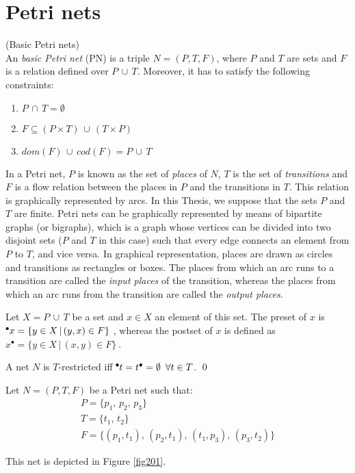 \section{Petri nets}

\begin{definition} (Basic Petri nets)\\
An \emph{basic Petri net} (PN) is a triple $N=(P,T,F)$, where $P$ and $T$
are sets and $F$ is a relation defined over $P \,\cup\,T$. Moreover, it has to satisfy
the following constraints:
\begin{enumerate}
\item $P \,\cap \,T = \emptyset$
\item $F \subseteq (P \times T) \,\cup\, (T \times P)$
\item $dom(F) \, \cup \, cod(F) = P \, \cup \, T$
\end{enumerate}

In a Petri net, $P$ is known as the set of \emph{places} of $N$, $T$ 
is the set of {\it transitions} and $F$ is a flow relation between the places in $P$
and the transitions in $T$. This relation is graphically represented by arcs.
In this Thesis, we suppose that the sets $P$ and $T$ are finite. Petri nets
can be graphically represented by means of bipartite graphs (or bigraphs), which
is a graph whose vertices can be divided into two disjoint sets ($P$ and $T$ in this case) such that 
every edge connects an element from $P$ to $T$, and vice versa. In graphical representation, places are drawn
as circles and transitions as rectangles or boxes.  The places 
from which an arc runs to a transition are called the \emph{input places} of the transition, whereas
the places from which an arc runs from the transition are called the \emph{output places}.

Let $X = P\,\cup\,T$ be a set and $x \in X$
an element of this set. The preset of $x$ is
$\hspace*{-0.4em}~^{\bullet} \hspace*{-0.05em}x = \{ y \in X \,|\, (y,x) \in F\}~$, whereas the postset of $x$ 
is defined as $x^{\bullet} = \{ y \in X \,|\, (x,y) \in F\}~$.

A net $N$ is $T$-restricted iff $\hspace*{-0.4em}~^{\bullet} \hspace*{-0.05em}t = t^{\bullet} =
\emptyset\,\,\,\forall t \in T$.
\qed
\end{definition}

\begin{example} Let $N=(P,T,F)$ be a Petri net such that:
\[\begin{array}{l}
P = \{ p_1,\,p_2,\,p_3\}\\
T = \{ t_1,\,t_2\}\\
F = \{ (p_1,t_1),\,(p_2,t_1),\,(t_1,p_3),\,(p_3,t_2)\}
\end{array}\]

This net is depicted in Figure \ref{fig201}.
\end{example}

